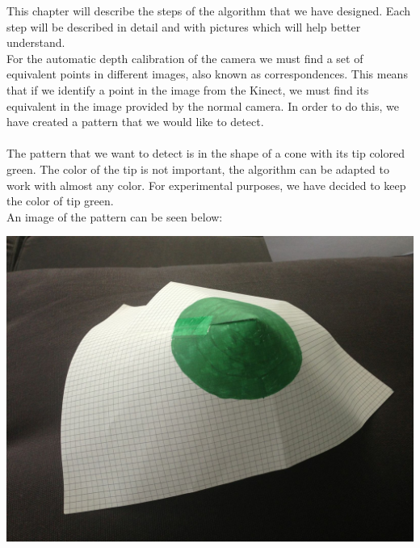 \noindent
This chapter will describe the steps of the algorithm that we have designed. Each step will be described in detail and with pictures which will help better understand.
\\
For the automatic depth calibration of the camera we must find a set of equivalent points in different images, also known as correspondences. This means that if we identify a point in the image from the Kinect, we must find its equivalent in the image provided by the normal camera. In order to do this, we have created a pattern that we would like to detect. 
\\\\
The pattern that we want to detect is in the shape of a cone with its tip colored green. The color of the tip is not important, the algorithm can be adapted to work with almost any color. For experimental purposes, we have decided to keep the color of tip green. 
\\
An image of the pattern can be seen below:

\begin{center}
	\includegraphics[scale=0.1]{images/pattern_1.jpg}
	\label{fig:small_pattern}
\end{center}


